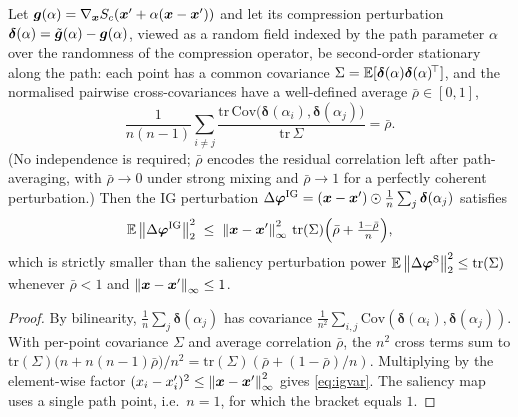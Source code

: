 \begin{theorem}
\label{thm:ordering}
Let $\bm{g}(\alpha)=\nabla_{\bm{x}}S_c(\bm{x}'+\alpha(\bm{x}-\bm{x}'))$ and let its compression
perturbation $\bm\delta(\alpha)=\tilde{\bm{g}}(\alpha)-\bm{g}(\alpha)$, viewed as a random
field indexed by the path parameter $\alpha$ over the randomness of the
compression operator, be second-order stationary along the path: each point has a
common covariance $\Sigma=\mathbb{E}[\bm\delta(\alpha)\bm\delta(\alpha)^{\!\top}]$, and
the normalised pairwise cross-covariances have a well-defined average
$\bar\rho\in[0,1]$,
\begin{equation}
\frac1{n(n-1)}\sum_{i\ne j}
\frac{\mathrm{tr}\,\mathrm{Cov}\bigl(\bm\delta(\alpha_i),\bm\delta(\alpha_j)\bigr)}
{\mathrm{tr}\,\Sigma}=\bar\rho .
\label{eq:avgcorr}
\end{equation}
(No independence is required; $\bar\rho$ encodes
the residual correlation left after path-averaging, with $\bar\rho\to0$ under
strong mixing and $\bar\rho\to1$ for a perfectly coherent perturbation.) Then the
IG perturbation
$\Delta\bm{\varphi}^{\mathrm{IG}}=(\bm{x}-\bm{x}')\odot\tfrac1n\sum_{j}\bm\delta(\alpha_j)$
satisfies
\begin{equation}
\mathbb{E}\left\lVert\Delta\bm{\varphi}^{\mathrm{IG}}\right\rVert_2^2\;\le\;\left\lVert\bm{x}-\bm{x}'\right\rVert_\infty^2\,
\mathrm{tr}(\Sigma)\Bigl(\bar\rho+\tfrac{1-\bar\rho}{n}\Bigr),
\label{eq:igvar}
\end{equation}
which is strictly smaller than the saliency perturbation power
$\mathbb{E}\left\lVert\Delta\bm{\varphi}^{\mathrm S}\right\rVert_2^2\le\mathrm{tr}(\Sigma)$ whenever
$\bar\rho<1$ and $\left\lVert\bm{x}-\bm{x}'\right\rVert_\infty\le1$.
\end{theorem}

\begin{proof}
By bilinearity, $\tfrac1n\sum_j\bm\delta(\alpha_j)$ has covariance
$\tfrac1{n^2}\sum_{i,j}\mathrm{Cov}(\bm\delta(\alpha_i),\bm\delta(\alpha_j))$.
With per-point covariance $\Sigma$ and average correlation $\bar\rho$, the
$n^2$ cross terms sum to $\mathrm{tr}(\Sigma)\bigl(n+n(n-1)\bar\rho\bigr)/n^2=
\mathrm{tr}(\Sigma)(\bar\rho+(1-\bar\rho)/n)$. Multiplying by the element-wise
factor $(x_i-x'_i)^2\le\left\lVert\bm{x}-\bm{x}'\right\rVert_\infty^2$ gives \eqref{eq:igvar}. The
saliency map uses a single path point, i.e.\ $n=1$, for which the bracket equals
$1$.
\end{proof}

